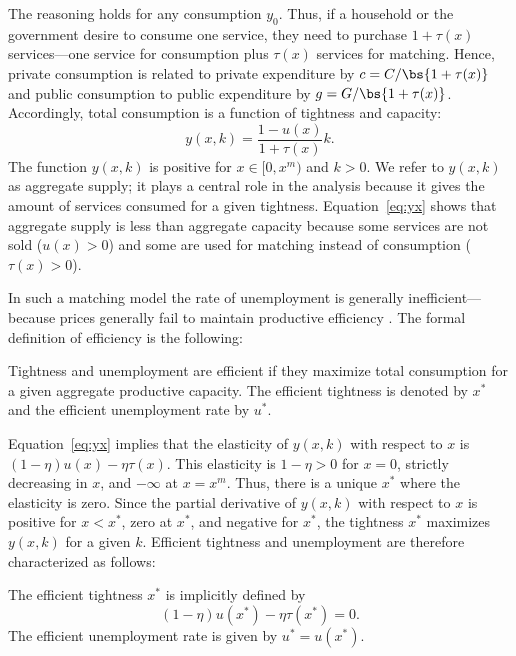\documentclass[letterpaper,12pt,leqno]{article}
\begin{document}
\begin{bibunit}
The reasoning holds for any consumption $y_0$. Thus, if a household or the government desire to consume one service, they need to purchase $1+\tau(x)$ services---one service for consumption plus $\tau(x)$ services for matching. Hence, private consumption is related to private expenditure by $c=C/\bs{1+\tau(x)}$ and public consumption to public expenditure by $g=G/\bs{1+\tau(x)}$. Accordingly, total consumption is a function of tightness and capacity:
\begin{equation}
y(x,k)  =  \frac{1-u(x)}{1+\tau(x)} k.
\label{eq:yx}\end{equation}
The function $y(x,k)$ is positive for $x\in[0,x^{m})$ and $k>0$. We refer to $y(x,k)$ as aggregate supply; it plays a central role in the analysis because it gives the amount of services consumed for a given tightness. Equation~\eqref{eq:yx} shows that aggregate supply is less than aggregate capacity because some services are not sold ($u(x)>0$) and some are used for matching instead of consumption ($\tau(x)>0$).

In such a matching model the rate of unemployment is generally inefficient---because prices generally fail to maintain productive efficiency . The formal definition of efficiency is the following:

\begin{defn} Tightness and unemployment are efficient if they maximize total consumption for a given aggregate productive capacity. The efficient tightness is denoted by $x^{*}$ and the efficient unemployment rate by $u^{*}$.\end{defn}

Equation~\eqref{eq:yx} implies that the elasticity of $y(x,k)$ with respect to $x$ is $(1-\eta)  u(x)-\eta \tau(x)$. This elasticity is $1-\eta>0$ for $x=0$, strictly decreasing in $x$, and $-\infty$ at $x=x^{m}$. Thus, there is a unique $x^*$ where the elasticity is zero. Since the partial derivative of $y(x,k)$ with respect to $x$ is positive for $x<x^*$, zero at $x^*$, and negative for $x^*$, the tightness $x^*$ maximizes $y(x,k)$ for a given $k$. Efficient tightness and unemployment are therefore characterized as follows:

\begin{lem} The efficient tightness $x^{*}$ is implicitly defined by
\begin{equation}
(1-\eta)  u(x^{*}) - \eta   \tau(x^{*}) = 0.
\label{eq:xstar}\end{equation} 
The efficient unemployment rate is given by $u^{*}=u(x^{*})$.\end{lem}


\end{bibunit}
\end{document}
